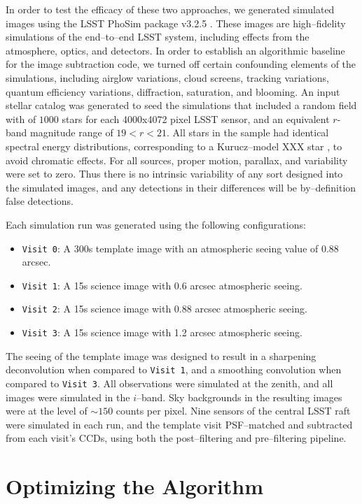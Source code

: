 \documentclass[floatfix, apj]{emulateapj}
\begin{document}
In order to test the efficacy of these two approaches, we generated simulated images using the LSST PhoSim package v3.2.5 \cite{phosim}.
These images are high--fidelity simulations of the end--to--end LSST system, including effects from the atmosphere, optics, and detectors.
In order to establish an algorithmic baseline for the image subtraction code, we turned off certain confounding elements of the simulations, including airglow variations, cloud screens, tracking variations, quantum efficiency variations, diffraction, saturation, and blooming.
An input stellar catalog was generated to seed the simulations that included a random field with of $1000$ stars for each 4000x4072 pixel LSST sensor, and an equivalent $r$-band magnitude range of $19<r<21$.
All stars in the sample had identical spectral energy distributions, corresponding to a Kurucz--model XXX star \cite{kurucz}, to avoid chromatic effects.
For all sources, proper motion, parallax, and variability were set to zero.
Thus there is no intrinsic variability of any sort designed into the simulated images, and any detections in their differences will be by--definition false detections.

Each simulation run was generated using the following configurations:
\begin{itemize}
\item {\tt Visit 0}: A 300s template image with an atmospheric seeing value of 0.88 arcsec.
\item {\tt Visit 1}: A 15s science image with 0.6 arcsec atmospheric seeing.
\item {\tt Visit 2}: A 15s science image with 0.88 arcsec atmospheric seeing.
\item {\tt Visit 3}: A 15s science image with 1.2 arcsec atmospheric seeing.
\end{itemize}
The seeing of the template image was designed to result in a sharpening deconvolution when compared to {\tt Visit 1}, and a smoothing convolution when compared to {\tt Visit 3}.
All observations were simulated at the zenith, and all images were simulated in the $i$--band.
Sky backgrounds in the resulting images were at the level of $\sim 150$ counts per pixel.
Nine sensors of the central LSST raft were simulated in each run, and the template visit PSF--matched and subtracted from each visit's CCDs, using both the post--filtering and pre--filtering pipeline.

\section{Optimizing the Algorithm}
\end{document}
